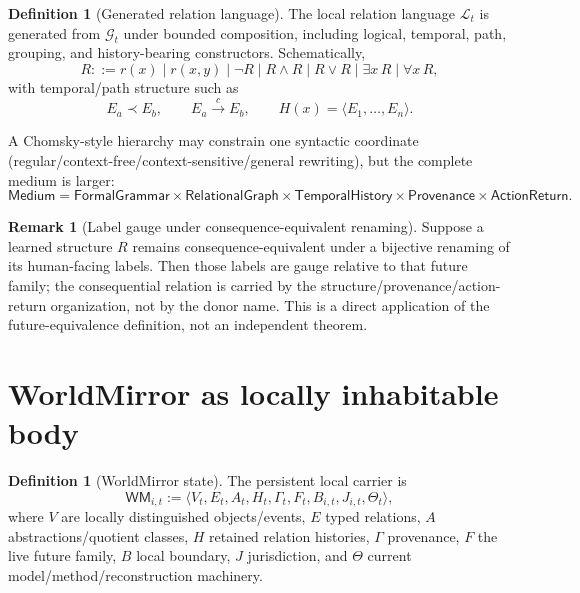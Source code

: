 \documentclass[10pt]{article}
\theoremstyle{venus}
\theoremstyle{definition}
\newtheorem{definition}[theorem]{Definition}
\newtheorem{remark}[theorem]{Remark}
\newcommand{\WM}{\mathsf{WM}}
\begin{document}
\begin{definition}[Generated relation language]
The local relation language $\mathcal L_t$ is generated from $\mathcal G_t$
under bounded composition, including logical, temporal, path, grouping, and
history-bearing constructors. Schematically,
\[
R ::= r(x)\mid r(x,y)\mid \neg R\mid R\wedge R\mid R\vee R
\mid \exists x\,R\mid \forall x\,R,
\]
with temporal/path structure such as
\[
E_a\prec E_b,
\qquad
E_a\xrightarrow{c}E_b,
\qquad
H(x)=\langle E_1,\dots,E_n\rangle.
\]
\end{definition}

A Chomsky-style hierarchy may constrain one syntactic coordinate
(regular/context-free/context-sensitive/general rewriting), but the complete
medium is larger:
\begin{equation}\label{eq:medium}
\boxed{
\mathsf{Medium}
=
\mathsf{FormalGrammar}
\times\mathsf{RelationalGraph}
\times\mathsf{TemporalHistory}
\times\mathsf{Provenance}
\times\mathsf{ActionReturn}.
}
\end{equation}

\begin{remark}[Label gauge under consequence-equivalent renaming]
Suppose a learned structure $R$ remains consequence-equivalent under a
bijective renaming of its human-facing labels. Then those labels are gauge
relative to that future family; the consequential relation is carried by the
structure/provenance/action-return organization, not by the donor name. This
is a direct application of the future-equivalence definition, not an
independent theorem.
\end{remark}

\section{WorldMirror as locally inhabitable body}

\begin{definition}[WorldMirror state]
The persistent local carrier is
\begin{equation}\label{eq:wm}
\WM_{i,t}
:=
\langle
V_t,E_t,A_t,H_t,\Gamma_t,F_t,B_{i,t},J_{i,t},\Theta_t
\rangle,
\end{equation}
where $V$ are locally distinguished objects/events, $E$ typed relations, $A$
abstractions/quotient classes, $H$ retained relation histories, $\Gamma$
provenance, $F$ the live future family, $B$ local boundary, $J$ jurisdiction,
and $\Theta$ current model/method/reconstruction machinery.
\end{definition}
\end{document}
